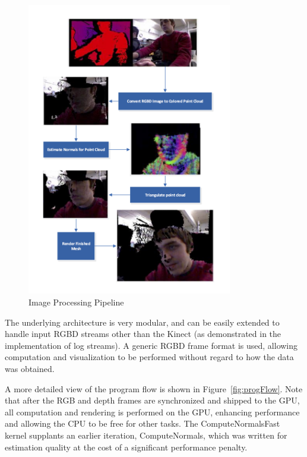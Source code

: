 \documentclass{jcgt}
\begin{document}
\begin{figure}[htb]
  \centering
   \includegraphics[width=0.8\textwidth]{../../diagrams/ImageProcessingPipeline.png}
   \caption{\label{fig:imgProcPipeline}
        Image Processing Pipeline}
\end{figure}

The underlying architecture is very modular, and can be easily extended to handle input RGBD streams other than the Kinect (as demonstrated in the implementation of log streams). A generic RGBD frame format is used, allowing computation and visualization to be performed without regard to how the data was obtained.

A more detailed view of the program flow is shown in Figure~\ref{fig:progFlow}. Note that after the RGB and depth frames are synchronized and shipped to the GPU, all computation and rendering is performed on the GPU, enhancing performance and allowing the CPU to be free for other tasks. The ComputeNormalsFast kernel supplants an earlier iteration, ComputeNormals, which was written for estimation quality at the cost of a significant performance penalty.
\end{document}
